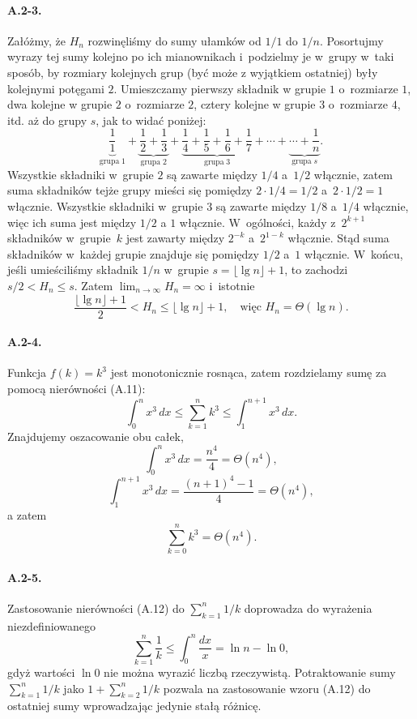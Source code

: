 \paragraph{A.2-3.}
Załóżmy, że $H_n$ rozwinęliśmy do sumy ułamków od $1/1$ do $1/n$. Posortujmy wyrazy tej sumy kolejno po ich mianownikach i~podzielmy je w~grupy w~taki sposób, by rozmiary kolejnych grup (być może z wyjątkiem ostatniej) były kolejnymi potęgami $2$. Umieszczamy pierwszy składnik w grupie $1$ o~rozmiarze $1$, dwa kolejne w grupie $2$ o~rozmiarze $2$, cztery kolejne w grupie $3$ o~rozmiarze $4$, itd. aż do grupy $s$, jak to widać poniżej:
\[
	\underbrace{\frac{1}{1}}_{\mathrm{grupa\;}1}+\underbrace{\frac{1}{2}+\frac{1}{3}}_{\mathrm{grupa\;} 2}+\underbrace{\frac{1}{4}+\frac{1}{5}+\frac{1}{6}+\frac{1}{7}}_{\mathrm{grupa\;}3}+\cdots+\underbrace{\cdots +\frac{1}{n}}_{\mathrm{grupa\;}s}.
\]
Wszystkie składniki w~grupie $2$ są zawarte między $1/4$ a~$1/2$ włącznie, zatem suma składników tejże grupy mieści się pomiędzy $2\cdot 1/4 = 1/2$ a~$2\cdot 1/2 = 1$ włącznie. Wszystkie składniki w~grupie $3$ są zawarte między $1/8$ a~$1/4$ włącznie, więc ich suma jest między $1/2$ a $1$ włącznie. W~ogólności, każdy z~$2^{k+1}$ składników w~grupie~$k$ jest zawarty między $2^{-k}$ a~$2^{1-k}$ włącznie. Stąd suma składników w~każdej grupie znajduje się pomiędzy $1/2$ a~$1$ włącznie. W~końcu, jeśli umieściliśmy składnik $1/n$ w~grupie $s = \lfloor\lg n\rfloor+1$, to zachodzi $s/2<H_n\le s$. Zatem $\lim_{n\to\infty}H_n=\infty$ i~istotnie
\[
	\frac{\lfloor\lg n\rfloor+1}{2}<H_n\le\lfloor\lg n\rfloor+1,\quad\mbox{więc }H_n=\Theta(\lg n).
\]

\paragraph{A.2-4.}
Funkcja $f(k)=k^3$ jest monotonicznie rosnąca, zatem rozdzielamy sumę za pomocą nierówności (A.11):
\begin{equation*}
	\int_0^nx^3\,dx\le\sum_{k=1}^nk^3\le\int_1^{n+1}x^3\,dx.
\end{equation*}
Znajdujemy oszacowanie obu całek,
\[
	\int_0^nx^3\,dx = \frac{n^4}{4} = \Theta(n^4),
\]
\[
	\int_1^{n+1}x^3\,dx = \frac{(n+1)^4-1}{4} = \Theta(n^4),
\]
a zatem
\[
	\sum_{k=0}^nk^3 = \Theta(n^4).
\]

\paragraph{A.2-5.}
Zastosowanie nierówności (A.12) do $\sum_{k=1}^n1/k$ doprowadza do wyrażenia niezdefiniowanego
\[
	\sum_{k=1}^n\frac{1}{k}\le\int_0^n\frac{dx}{x}=\ln n-\ln 0,
\]
gdyż wartości $\ln 0$ nie można wyrazić liczbą rzeczywistą. Potraktowanie sumy $\sum_{k=1}^n1/k$ jako $1+\sum_{k=2}^n1/k$ pozwala na zastosowanie wzoru (A.12) do ostatniej sumy wprowadzając jedynie stałą różnicę.


